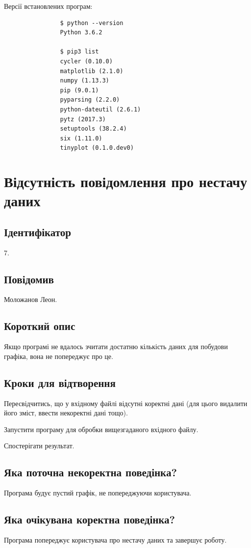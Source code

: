 \documentclass[a4paper,oneside,DIV=12,12pt]{scrartcl}
\begin{document}
			Версії встановлених програм:
			\begin{lstlisting}
				$ python --version
				Python 3.6.2

				$ pip3 list
				cycler (0.10.0)
				matplotlib (2.1.0)
				numpy (1.13.3)
				pip (9.0.1)
				pyparsing (2.2.0)
				python-dateutil (2.6.1)
				pytz (2017.3)
				setuptools (38.2.4)
				six (1.11.0)
				tinyplot (0.1.0.dev0)
			\end{lstlisting}
			
	\section{Відсутність повідомлення про нестачу даних}
		\subsection{Ідентифікатор}
			7.
			
		\subsection{Повідомив}
			Моложанов Леон.
			
		\subsection{Короткий опис}
			Якщо програмі не вдалось зчитати достатню кількість даних для побудови графіка, вона не попереджує про це.
			
		\subsection{Кроки для відтворення}
			\begin{steps}
				\item Пересвідчитись, що у вхідному файлі відсутні коректні дані (для цього видалити його зміст, ввести некоректні дані тощо).
				\item Запустити програму для обробки вищезгаданого вхідного файлу.
				\item Спостерігати результат.
			\end{steps}
			
		\subsection{Яка поточна некоректна поведінка?}
			Програма будує пустий графік, не попереджуючи користувача.
			
		\subsection{Яка очікувана коректна поведінка?}
			Програма попереджує користувача про нестачу даних та завершує роботу.
			
\end{document}
